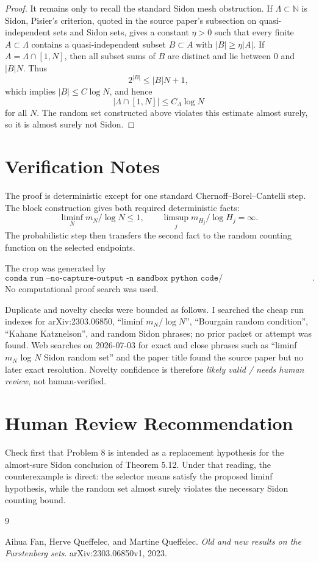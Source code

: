 \documentclass[11pt]{article}
\newcommand{\N}{\mathbb N}
\begin{document}
\begin{proof}
It remains only to recall the standard Sidon mesh obstruction. If
\(\Lambda\subset\N\) is Sidon, Pisier's criterion, quoted in the source
paper's subsection on quasi-independent sets and Sidon sets, gives a constant
\(\eta>0\) such that every finite
\(A\subset\Lambda\) contains a quasi-independent subset
\(B\subset A\) with \(|B|\geq \eta |A|\). If \(A=\Lambda\cap[1,N]\), then all
subset sums of \(B\) are distinct and lie between \(0\) and \(|B|N\). Thus
\[
  2^{|B|}\leq |B|N+1,
\]
which implies \(|B|\leq C\log N\), and hence
\[
  |\Lambda\cap[1,N]|\leq C_\Lambda \log N
\]
for all \(N\). The random set constructed above violates this estimate almost
surely, so it is almost surely not Sidon.
\end{proof}

\section*{Verification Notes}

The proof is deterministic except for one standard Chernoff--Borel--Cantelli
step. The block construction gives both required deterministic facts:
\[
  \liminf_N m_N/\log N\leq 1,
  \qquad
  \limsup_j m_{H_j}/\log H_j=\infty.
\]
The probabilistic step then transfers the second fact to the random counting
function on the selected endpoints.

The crop was generated by
\[
\texttt{conda run --no-capture-output -n sandbox python code/make\_open\_problem\_crop.py}.
\]
No computational proof search was used.

Duplicate and novelty checks were bounded as follows. I searched the cheap run
indexes for arXiv:2303.06850, ``liminf \(m_N/\log N\)'', ``Bourgain random
condition'', ``Kahane Katznelson'', and random Sidon phrases; no prior packet
or attempt was found. Web searches on 2026-07-03 for exact and close phrases
such as ``liminf \(m_N\) log \(N\) Sidon random set'' and the paper title
found the source paper but no later exact resolution. Novelty confidence is
therefore \emph{likely valid / needs human review}, not human-verified.

\section*{Human Review Recommendation}

Check first that Problem 8 is intended as a replacement hypothesis for the
almost-sure Sidon conclusion of Theorem 5.12. Under that reading, the
counterexample is direct: the selector means satisfy the proposed liminf
hypothesis, while the random set almost surely violates the necessary Sidon
counting bound.

\begin{thebibliography}{9}

Aihua Fan, Herve Queffelec, and Martine Queffelec.
\newblock \emph{Old and new results on the Furstenberg sets}.
\newblock arXiv:2303.06850v1, 2023.

\end{thebibliography}
\end{document}
